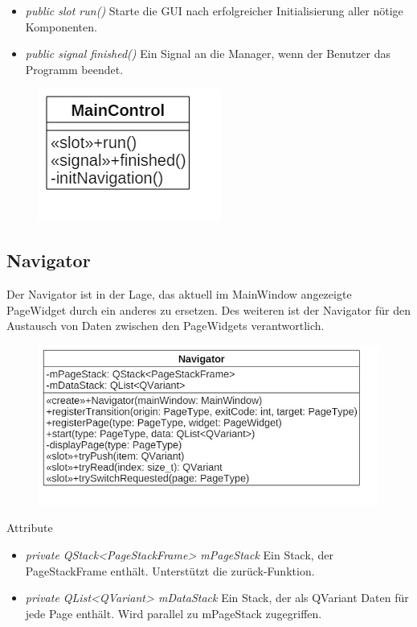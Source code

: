 \begin{itemize}
	\item\textit{public slot run()}
	Starte die GUI nach erfolgreicher Initialisierung aller nötige Komponenten.
	\item\textit{public signal finished()}
	Ein Signal an die Manager, wenn der Benutzer das Programm beendet.
\end{itemize}

\begin{figure}[H]
\centering
\includegraphics[scale=0.5]{img/Klassendiagramm/Klassen/Controller/MainControl}
\label{fig:mainControl}
\end{figure}

\subsection*{Navigator}
Der Navigator ist in der Lage, das aktuell im MainWindow angezeigte PageWidget durch ein anderes zu ersetzen. Des weiteren ist der Navigator für den Austausch von Daten zwischen den PageWidgets verantwortlich.

\begin{figure}[H]
\centering
\includegraphics[scale=0.5]{img/Klassendiagramm/Klassen/Controller/Navigator}
\label{fig:navigator}
\end{figure}

Attribute
\begin{itemize}
	\item\textit{private QStack<PageStackFrame> mPageStack}
	Ein Stack, der PageStackFrame enthält. Unterstützt die zurück-Funktion.
	\item\textit{private QList<QVariant> mDataStack}
	Ein Stack, der als QVariant Daten für jede Page enthält. Wird parallel zu mPageStack zugegriffen.

\end{itemize}

